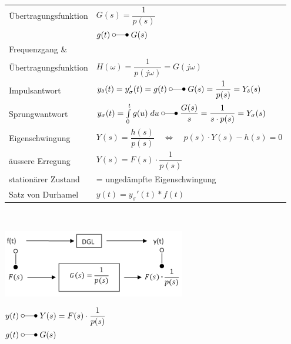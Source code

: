 			\begin{minipage}{12cm}

				\renewcommand{\arraystretch}{2}
					\begin{tabular}{| l | l |}		%
						\hline
							Übertragungsfunktion & $G(s) = \dfrac{1}{p(s)}$\\
							& $g(t) \; \laplace \; G(s)$ \\
						\hline
							Frequenzgang \& \\ Übertragungsfunktion  & $H(\omega) = \dfrac{1}{p(j\omega)} = G(j\omega) $ \\
						\hline
							Impulsantwort & $y_{\delta}(t) = y_{\sigma}'(t) = g(t) \; \laplace \; G(s) = \dfrac{1}{p(s)}=Y_{\delta}(s)$\\
						\hline
							Sprungwantwort & $y_{\sigma}(t)=\int\limits_0^t g(u) \; du \; \laplace \; \dfrac{G(s)}{s} = \dfrac{1}{s \cdot p(s)} = Y_{\sigma}(s)$\\
						\hline
							Eigenschwingung & $Y(s) = \dfrac{h(s)}{p(s)} \quad \iff \quad p(s) \cdot Y(s)-h(s) = 0$ \\
						\hline
							äussere Erregung & $ Y(s) = F(s) \cdot \dfrac{1}{p(s)}$ \\
						\hline
							stationärer Zustand & = ungedämpfte Eigenschwingung\\
						\hline
						\hline
							Satz von Durhamel & $y(t) = y_{\sigma}'(t) * f(t)$\\
						\hline
					\end{tabular}
				\renewcommand{\arraystretch}{\arraystretchOriginal}\\
			
			\end{minipage}
			\begin{minipage}[b]{8cm}
				\includegraphics[width=8cm]{./bilder/diffgleichungen2.png} \\[7mm]

					\hspace{3cm}\begin{minipage}{4cm}
						$
						\begin{aligned}
							y(t) \; &\laplace \; Y(s) = F(s) \cdot \dfrac{1}{p(s)}\\
							g(t) \; &\laplace \; G(s) \\
						\end{aligned}
						$
					\end{minipage}	
			\end{minipage}
		

